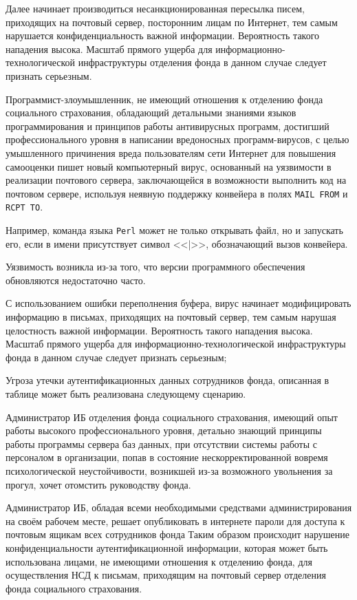 Далее начинает производиться несанкционированная пересылка писем,
приходящих на почтовый сервер, посторонним лицам по Интернет, тем
самым нарушается конфиденциальность важной информации. Вероятность
такого нападения высока. Масштаб прямого ущерба для
информационно-технологической инфраструктуры отделения фонда в данном
случае следует признать серьезным.

\point Программист-злоумышленник, не имеющий отношения к отделению
фонда социального страхования, обладающий детальными знаниями языков
программирования и принципов работы антивирусных программ, достигший
профессионального уровня в написании вредоносных программ-вирусов, с
целью умышленного причинения вреда пользователям сети Интернет для
повышения самооценки пишет новый компьютерный вирус, основанный на
уязвимости в реализации почтового сервера, заключающейся в возможности
выполнить код на почтовом сервере, используя неявную поддержку
конвейера в полях \texttt{MAIL FROM} и \texttt{RCPT TO}.

Например, команда языка \texttt{Perl} может не только открывать файл,
но и запускать его, если в имени присутствует символ <<|>>,
обозначающий вызов конвейера.

Уязвимость возникла из-за того, что версии программного обеспечения
обновляются недостаточно часто.

С использованием ошибки переполнения буфера, вирус начинает
модифицировать информацию в письмах, приходящих на почтовый сервер,
тем самым нарушая целостность важной информации. Вероятность такого
нападения высока. Масштаб прямого ущерба для
информационно-технологической инфраструктуры фонда в данном случае
следует признать серьезным;

\point Угроза утечки аутентификационных данных сотрудников фонда,
описанная в таблице может быть реализована следующему сценарию.

\point Администратор ИБ отделения фонда социального страхования,
имеющий опыт работы высокого профессионального уровня, детально
знающий принципы работы программы сервера баз данных, при отсутствии
системы работы с персоналом в организации, попав в состояние
нескорректированной вовремя психологической неустойчивости, возникшей
из-за возможного увольнения за прогул, хочет отомстить руководству
фонда.

Администратор ИБ, обладая всеми необходимыми средствами
администрирования на своём рабочем месте, решает опубликовать в
интернете пароли для доступа к почтовым ящикам всех сотрудников фонда
Таким образом происходит нарушение конфиденциальности
аутентификационной информации, которая может быть использована лицами,
не имеющими отношения к отделению фонда, для осуществления НСД к
письмам, приходящим на почтовый сервер отделения фонда социального
страхования.

